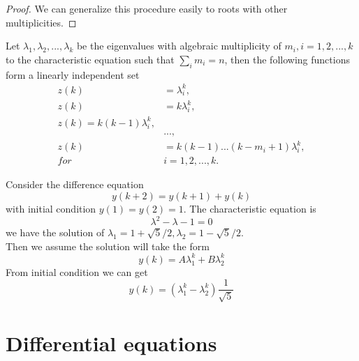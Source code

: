 \begin{refsection}
\begin{proof}
We can generalize this procedure easily to roots with other multiplicities.

\end{proof}


\begin{theorem}\label{ch:dynamical-systems:th:solutiontolineardifferenceequationwithconstantcoefficients}
Let $\lambda_1,\lambda_2,...,\lambda_k$ be the eigenvalues with algebraic multiplicity of $m_i,i=1,2,...,k$ to the characteristic equation such that $\sum_i m_i = n$, then the following functions form a linearly independent set
\begin{align*}
z(k) &= \lambda_i^k,\\
z(k) &= k\lambda_i^{k},\\ z(k)=k(k-1)\lambda_i^k,\\
&...,\\
z(k) &= k(k-1)...(k-m_i+1)\lambda_i^k,\\
for~&i=1,2,...,k.
\end{align*}
\end{theorem}








\begin{example}\cite[35]{luenberger1979introduction}
Consider the difference equation 
$$y(k+2)=y(k+1) + y(k)$$ with initial condition $y(1)=y(2)=1$. 
The characteristic equation is 
$$\lambda^2 - \lambda - 1 = 0$$
we have the solution of
$\lambda_1 = 1+\sqrt{5}/2, \lambda_2 = 1-\sqrt{5}/2$.\\
Then we assume the solution will take the form 
$$y(k)=A\lambda_1^k + B\lambda_2^k$$
From initial condition we can get
$$y(k)= (\lambda_1^k - \lambda_2^k)\frac{1}{\sqrt{5}}$$
\end{example}



\section{Differential equations}

\end{refsection}
